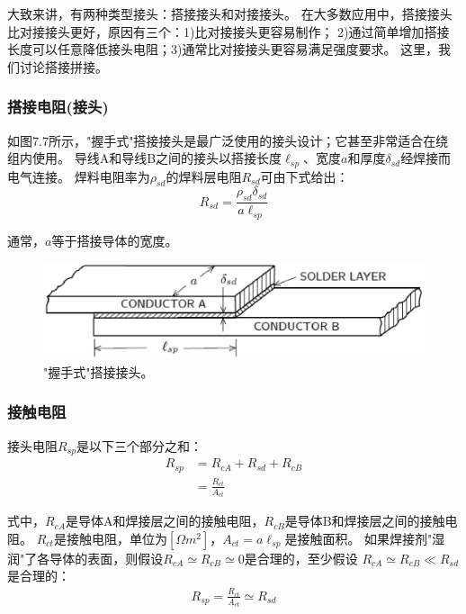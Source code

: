 大致来讲，有两种类型接头：搭接接头和对接接头。
在大多数应用中，搭接接头比对接接头更好，原因有三个：1)比对接接头更容易制作；
2)通过简单增加搭接长度可以任意降低接头电阻；3)通常比对接接头更容易满足强度要求。
这里，我们讨论搭接拼接。

\subsubsection*{搭接电阻(接头)}
如图7.7所示，"握手式"搭接接头是最广泛使用的接头设计；它甚至非常适合在绕组内使用。
导线A和导线B之间的接头以搭接长度$\ell_{sp}$、宽度$a$和厚度$\delta_{sd}$经焊接而电气连接。
焊料电阻率为$\rho_{sd}$的焊料层电阻$R_{sd}$可由下式给出：
\begin{equation}%
R_{sd}=\frac{\rho_{sd}\delta_{sd}}{a\ell_{sp}}
\end{equation}

通常，$a$等于搭接导体的宽度。
\begin{figure}[htbp]
	\centering
	\includegraphics[scale=0.6]{chpt7/figs/fig7.7.eps}
	\caption{"握手式"搭接接头。}
\end{figure}

\subsubsection*{接触电阻}
接头电阻$R_{sp}$是以下三个部分之和：
\begin{subequations}
	\begin{align}
R_{sp}&=R_{cA}+R_{sd}+R_{cB} \\
&=\frac{R_{ct}}{A_{ct}}
	\end{align}
\end{subequations}

式中，$R_{cA}$是导体A和焊接层之间的接触电阻，$R_{cB}$是导体B和焊接层之间的接触电阻。
$R_{ct}$是接触电阻，单位为$[\Omega m^2]$，$A_{ct}=a\ell_{sp}$是接触面积。
如果焊接剂"湿润"了各导体的表面，则假设$R_{cA}\simeq R_{cB}\simeq 0$是合理的，至少假设
$R_{cA}\simeq R_{cB}\ll R_{sd}$是合理的：
\begin{align*}%
R_{sp}=\frac{R_{ct}}{A_{ct}}\simeq R_{sd} \tag{7.9c}
\end{align*}

